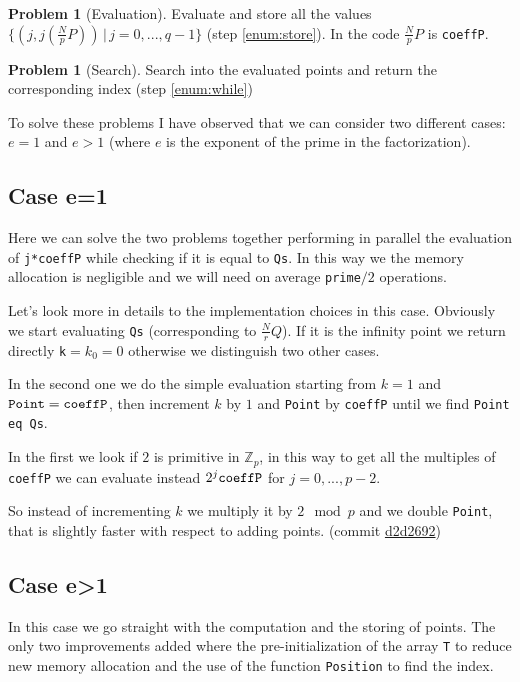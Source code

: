 \documentclass{article}
\theoremstyle{plain}
\theoremstyle{remark}
\theoremstyle{definition}
\newtheorem{prob}[teo]{Problem}
\begin{document}
\begin{prob}[Evaluation]
	Evaluate and store all the values $\{ (j,j\left(\frac{N}{p}P\right)) \,|\, j = 0,...,q-1 \}$ (step \ref{enum:store}). In the code $\frac{N}{p}P$ is \verb|coeffP|. 
\end{prob}

\begin{prob}[Search]
	Search into the evaluated points and return the corresponding index (step \ref{enum:while})
\end{prob}

To solve these problems I have observed that we can consider two different cases: $e=1$ and $e>1$ (where $e$ is the exponent of the prime in the factorization).

\subsection{Case e=1}
Here we can solve the two problems together performing in parallel the evaluation of \verb|j*coeffP| while checking if it is equal to \verb|Qs|. In this way we the memory allocation is negligible and we will need on average \verb|prime|$/2$ operations. 

Let's look more in details to the implementation choices in this case. Obviously we start evaluating \texttt{Qs} (corresponding to $\frac{N}{r}Q$). If it is the infinity point we return directly \verb|k|$=k_0 = 0$ otherwise we distinguish two other cases. 

In the second one we do the simple evaluation starting from $k = 1$ and $\verb|Point| = \verb|coeffP|$, then increment $k$ by $1$ and \verb|Point| by \verb|coeffP| until we find \verb|Point eq Qs|.

In the first we look if $2$ is primitive in $\mathbb{Z}_p$, in this way to get all the multiples of \verb|coeffP| we can evaluate instead $2^j\verb|coeffP|$ for $j = 0, ..., p-2$. 

So instead of incrementing $k$ we multiply it by $2 \mod p$ and we double \verb|Point|, that is slightly faster with respect to adding points. (commit \href{https://github.com/giacomoborin/project2_MAGMA/commit/d2d2692170bebfa2b465307761de5c7ee52121bf}{d2d2692})

\subsection{Case e>1}

In this case we go straight with the computation and the storing of points. The only two improvements added where the pre-initialization of the array \verb|T| to reduce new memory allocation and the use of the function \verb|Position| to find the index.
\end{document}
